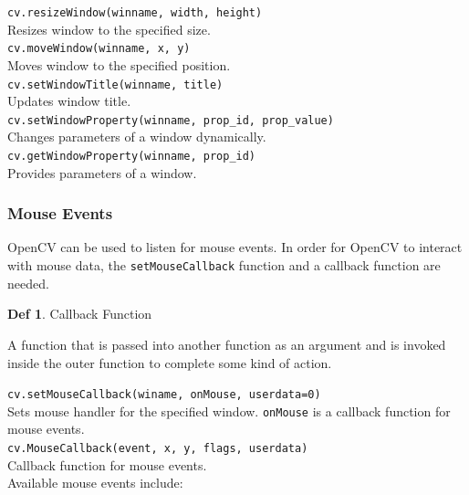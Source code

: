 \documentclass{article}
\theoremstyle{definition}
\newtheorem{df}{Def}
\theoremstyle{remark}
\newcommand{\func}[2]{\noindent\lstinline{#1}\\#2}
\begin{document}
\func{cv.resizeWindow(winname, width, height)}{Resizes window to the specified size.\\}

\func{cv.moveWindow(winname, x, y)}{Moves window to the specified position.\\}

\func{cv.setWindowTitle(winname, title)}{Updates window title.\\}

\func{cv.setWindowProperty(winname, prop_id, prop_value)}{Changes parameters of a window dynamically.\\}

\func{cv.getWindowProperty(winname, prop_id)}{Provides parameters of a window.\\}

\subsubsection{Mouse Events}

OpenCV can be used to listen for mouse events. In order for OpenCV to interact with mouse data, the \lstinline{setMouseCallback} function and a callback function are needed.

\begin{df}Callback Function

A function that is passed into another function as an argument and is invoked inside the outer function to complete some kind of action.
\end{df}


\func{cv.setMouseCallback(winame, onMouse, userdata=0)}{Sets mouse handler for the specified window. \lstinline{onMouse} is a callback function for mouse events.\\}

\func{cv.MouseCallback(event, x, y, flags, userdata)}{Callback function for mouse events.\\}

\noindent Available mouse events include:
\end{document}
